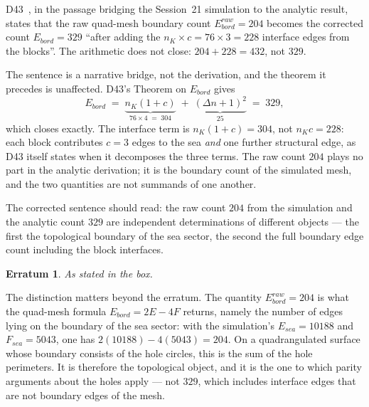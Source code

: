 \documentclass[11pt,a4paper]{article}
\def\mathrm#1{#1}%
\newtheorem{erratum}{Erratum}
\begin{document}
\begin{errbox}
D43~\citep{D43}, in the passage bridging the Session~21 simulation to the analytic result, states that the raw quad-mesh boundary count $E_{\mathrm{bord}}^{\mathrm{raw}}=204$ becomes the corrected count $E_{\mathrm{bord}}=329$ ``after adding the $n_K\times c=76\times3=228$ interface edges from the blocks''. The arithmetic does not close: $204+228=432$, not $329$.

The sentence is a narrative bridge, not the derivation, and the theorem it precedes is unaffected. D43's Theorem on $E_{\mathrm{bord}}$ gives
\[
E_{\mathrm{bord}} \;=\; \underbrace{n_K(1+c)}_{76\times4\;=\;304} \;+\; \underbrace{(\Delta n+1)^2}_{25} \;=\; 329,
\]
which closes exactly. The interface term is $n_K(1+c)=304$, not $n_K c=228$: each block contributes $c=3$ edges to the sea \emph{and} one further structural edge, as D43 itself states when it decomposes the three terms. The raw count $204$ plays no part in the analytic derivation; it is the boundary count of the simulated mesh, and the two quantities are not summands of one another.

The corrected sentence should read: the raw count $204$ from the simulation and the analytic count $329$ are independent determinations of different objects --- the first the topological boundary of the sea sector, the second the full boundary edge count including the block interfaces.
\end{errbox}

\begin{erratum}
\label{err:D43sum}
As stated in the box.
\end{erratum}

The distinction matters beyond the erratum. The quantity $E_{\mathrm{bord}}^{\mathrm{raw}}=204$ is what the quad-mesh formula $E_{\mathrm{bord}}=2E-4F$ returns, namely the number of edges lying on the boundary of the sea sector: with the simulation's $E_{\mathrm{sea}}=10188$ and $F_{\mathrm{sea}}=5043$, one has $2(10188)-4(5043)=204$. On a quadrangulated surface whose boundary consists of the hole circles, this is the sum of the hole perimeters. It is therefore the topological object, and it is the one to which parity arguments about the holes apply --- not $329$, which includes interface edges that are not boundary edges of the mesh.
\end{document}
